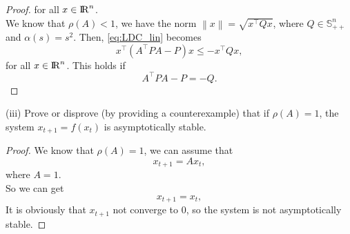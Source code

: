 \documentclass[a4paper,11pt,reqno]{amsart}
\newcommand{\R}{{\rm I\!R}}
\newcommand{\tran}{\intercal}
\newcommand{\smallplus}{{\scriptscriptstyle +}}
\newcommand{\Spp}{\mathbb{S}_{\smallplus\smallplus}}
\begin{document}
\begin{proof}
for all $x\in\R^n$.\\
We know that $\rho(A)<1$, we have the norm $\left\lVert x\right\rVert=\sqrt{x^{\tran}Qx}$, where $Q\in\Spp^n$ and $\alpha(s)=s^2$. Then, \eqref{eq:LDC_lin} becomes
\begin{equation}
    x^{\tran}(A^{\tran}PA-P)x\leq -x^{\tran}Qx,
\end{equation}
for all $x\in\R^n$. This holds if
\begin{equation}
    A^{\tran}PA-P=-Q.
\end{equation}
\end{proof}
(iii) Prove or disprove (by providing a counterexample) that if $\rho(A)=1$, the system $x_{t+1}=f(x_t)$ is asymptotically stable.
\\
\begin{proof}
    We know that $\rho(A)=1$, we can assume that 
    \begin{equation}
        x_{t+1}=Ax_t, 
    \end{equation}
    where $A=1$.
    \\
    So we can get
    \begin{equation}
        x_{t+1}=x_t, 
    \end{equation}
    It is obviously that $x_{t+1}$ not converge to 0, so the system is not asymptotically stable.
\end{proof}
\
\\ \\
\end{document}
